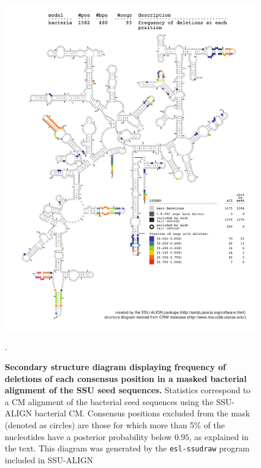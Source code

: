 \begin{figure}
\begin{center}
\includegraphics[width=5.7in]{Figures/bacteria-0p1-dall-wmask}
\end{center}
\caption[Secondary structure diagram displaying frequency of deletions
  of each consensus position in a masked bacterial alignment of the SSU seed
  sequences]{\textbf{Secondary structure diagram displaying frequency of deletions
  of each consensus position in a masked bacterial alignment of the SSU seed
  sequences.} Statistics correspond to a CM alignment of the bacterial
  seed sequences using the SSU-ALIGN bacterial CM. Consensus positions
  excluded from the mask (denoted as circles) are those for which 
  more than 5\% of the nucleotides have a posterior probability below
  $0.95$, as explained in the text. This diagram was generated by the
  {\tt esl-ssudraw} program included in SSU-ALIGN}.
\label{fig:bacdelmask}
\end{figure}

